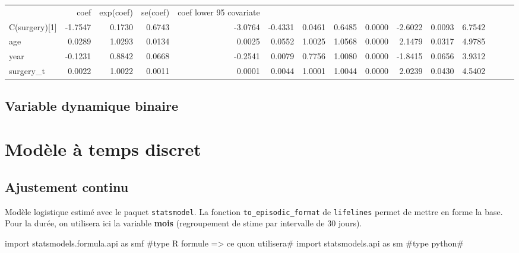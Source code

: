 \documentclass[
  12pt,
  letterpaper,
  DIV=11,
  numbers=noendperiod,
  onepage,
  openany]{scrreprt}
\newenvironment{Shaded}{\begin{snugshade}}{\end{snugshade}}
\newcommand{\CommentTok}[1]{\textcolor[rgb]{0.50,0.62,0.50}{#1}}
\newcommand{\ImportTok}[1]{\textcolor[rgb]{0.80,0.80,0.80}{#1}}
\newcommand{\NormalTok}[1]{\textcolor[rgb]{0.80,0.80,0.80}{#1}}
\begin{document}
\begin{tabular}{lrrrrrrrrrrr}
 & coef & exp(coef) & se(coef) & coef lower 95%
covariate &  &  &  &  &  &  &  &  &  &  &  \\
C(surgery)[1] & -1.7547 & 0.1730 & 0.6743 & -3.0764 & -0.4331 & 0.0461 & 0.6485 & 0.0000 & -2.6022 & 0.0093 & 6.7542 \\
age & 0.0289 & 1.0293 & 0.0134 & 0.0025 & 0.0552 & 1.0025 & 1.0568 & 0.0000 & 2.1479 & 0.0317 & 4.9785 \\
year & -0.1231 & 0.8842 & 0.0668 & -0.2541 & 0.0079 & 0.7756 & 1.0080 & 0.0000 & -1.8415 & 0.0656 & 3.9312 \\
surgery_t & 0.0022 & 1.0022 & 0.0011 & 0.0001 & 0.0044 & 1.0001 & 1.0044 & 0.0000 & 2.0239 & 0.0430 & 4.5402 \\
\end{tabular}

\hypertarget{variable-dynamique-binaire}{%
\subsection{Variable dynamique
binaire}\label{variable-dynamique-binaire}}

\hypertarget{moduxe8le-uxe0-temps-discret-3}{%
\section{Modèle à temps discret}\label{moduxe8le-uxe0-temps-discret-3}}

\hypertarget{ajustement-continu}{%
\subsection{Ajustement continu}\label{ajustement-continu}}

Modèle logistique estimé avec le paquet \texttt{statsmodel}. La fonction
\texttt{to\_episodic\_format} de \texttt{lifelines} permet de mettre en
forme la base.\\
Pour la durée, on utilisera ici la variable \textbf{mois} (regroupement
de stime par intervalle de 30 jours).

\begin{Shaded}
\begin{Highlighting}[]
\ImportTok{import}\NormalTok{ statsmodels.formula.api }\ImportTok{as}\NormalTok{ smf }\CommentTok{\#type R formule =\textgreater{} ce qu\textquotesingle{}on utilisera\#}
\ImportTok{import}\NormalTok{ statsmodels.api }\ImportTok{as}\NormalTok{ sm }\CommentTok{\#type python\#}
\end{Highlighting}
\end{Shaded}
\end{document}
